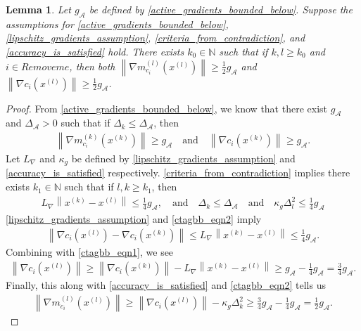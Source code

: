 \documentclass{article}
\newtheorem{lemma}[theorem]{Lemma}
\theoremstyle{case}
\numberwithin{theorem}{subsection}
\newcommand{\dk}{\Delta_k}
\newcommand{\dl}{\Delta_l}
\newcommand{\gmcik}{{\nabla m_{c_i}^{(k)}\left(\xk\right)}}
\newcommand{\gmcil}{{\nabla m_{c_i}^{(l)}\left(\xl\right)}}
\newcommand{\lipgrad}{{L_{\nabla}}}
\newcommand{\minactivegraddelta}{{\Delta_{\mathcal A}}}
\newcommand{\minactivegrad}{{ g_{\mathcal A} }}
\newcommand{\naturals}{\mathbb N}
\newcommand{\xk}{x^{(k)}}
\newcommand{\xl}{{x^{(l)}}}
\newcommand{\activeprojk}{{Remove me}}
\begin{document}
\begin{lemma}
\label{close_to_active_gradients_bounded_below}
Let $\minactivegrad$ be defined by \cref{active_gradients_bounded_below}.
Suppose the assumptions for 
\cref{active_gradients_bounded_below}, 
\cref{lipschitz_gradients_assumption}, 
\cref{criteria_from_contradiction},
and \cref{accuracy_is_satisfied} hold.
There exists $k_0 \in \naturals$ such that if $k, l \ge k_0$ and $i \in \activeprojk$,
then both
$\left\|\gmcil\right\| \ge \frac 1 2 \minactivegrad$
and
$\left\|\nabla c_i\left(\xl\right)\right\| \ge \frac 1 2  \minactivegrad$.
\end{lemma}
\begin{proof}
From \cref{active_gradients_bounded_below}, we know that there exist $\minactivegrad$ and $\minactivegraddelta > 0$ such that
if $\dk \le \minactivegraddelta$, then
\begin{align}
\label{ctagbb_eqn1}
\left\|\gmcik\right\| \ge \minactivegrad \quad \textrm{and} \quad
\left\|\nabla c_i\left(\xk\right)\right\| \ge \minactivegrad.
\end{align}
Let $\lipgrad$ and $\kappa_g$ be defined by \cref{lipschitz_gradients_assumption} and \cref{accuracy_is_satisfied} respectively.
\cref{criteria_from_contradiction} implies there exists $k_1 \in \naturals$ such that if $l, k \ge k_1$, then
\begin{align}
\label{ctagbb_eqn2}
\lipgrad \left\|\xk - \xl\right\| \le \frac 1 4 \minactivegrad,
\quad \textrm{and} \quad
\dk \le \minactivegraddelta
\quad \textrm{and} \quad
\kappa_g \dl^2 \le \frac 1 4 \minactivegrad
\end{align}
\cref{lipschitz_gradients_assumption} and \cref{ctagbb_eqn2} imply
\begin{align*}
\left\|\nabla c_i\left(\xl\right) - \nabla c_i\left(\xk\right)\right\| \le \lipgrad \left\|\xk - \xl\right\| \le \frac 1 4 \minactivegrad.
\end{align*}
Combining with \cref{ctagbb_eqn1}, we see
\begin{align*}
\left\|\nabla c_i\left(\xl\right)\right\| \ge \left\|\nabla c_i\left(\xk\right)\right\| - \lipgrad \left\|\xk - \xl\right\|
\ge \minactivegrad - \frac 1 4 \minactivegrad = \frac 3 4 \minactivegrad.
\end{align*}
Finally, this along with \cref{accuracy_is_satisfied} and \cref{ctagbb_eqn2} tells us
\begin{align*}
\left\|\gmcil\right\| \ge \left\|\nabla c_i\left(\xl\right)\right\| - \kappa_g \dk^2 \ge \frac 3 4 \minactivegrad - \frac 1 4 \minactivegrad = \frac 1 2 \minactivegrad.
\end{align*}
\end{proof}
\end{document}
